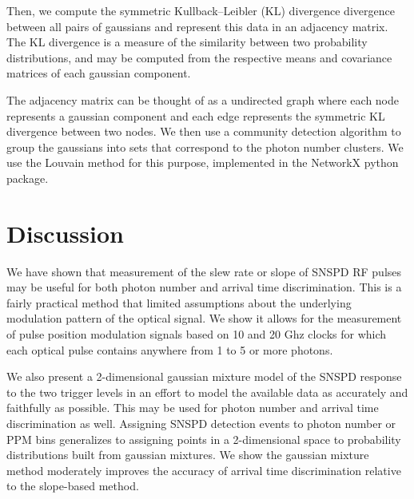 \documentclass[11pt]{caltech_thesis} %
\begin{document}
Then, we compute the symmetric Kullback--Leibler (KL) divergence divergence between all pairs of gaussians and represent this data in an adjacency matrix. The KL divergence is a measure of the similarity between two probability distributions, and may be computed from the respective means and covariance matrices of each gaussian component.

The adjacency matrix can be thought of as a undirected graph where each node represents a gaussian component and each edge represents the symmetric KL divergence between two nodes. We then use a community detection algorithm to group the gaussians into sets that correspond to the photon number clusters. We use the Louvain method \autocite{Blondel2008} for this purpose, implemented in the NetworkX python package.

\hypertarget{discussion}{%
\section{Discussion}\label{discussion}}

We have shown that measurement of the slew rate or slope of SNSPD RF pulses may be useful for both photon number and arrival time discrimination. This is a fairly practical method that limited assumptions about the underlying modulation pattern of the optical signal. We show it allows for the measurement of pulse position modulation signals based on 10 and 20 Ghz clocks for which each optical pulse contains anywhere from 1 to 5 or more photons.

We also present a 2-dimensional gaussian mixture model of the SNSPD response to the two trigger levels in an effort to model the available data as accurately and faithfully as possible. This may be used for photon number and arrival time discrimination as well. Assigning SNSPD detection events to photon number or PPM bins generalizes to assigning points in a 2-dimensional space to probability distributions built from gaussian mixtures. We show the gaussian mixture method moderately improves the accuracy of arrival time discrimination relative to the slope-based method.
\end{document}
